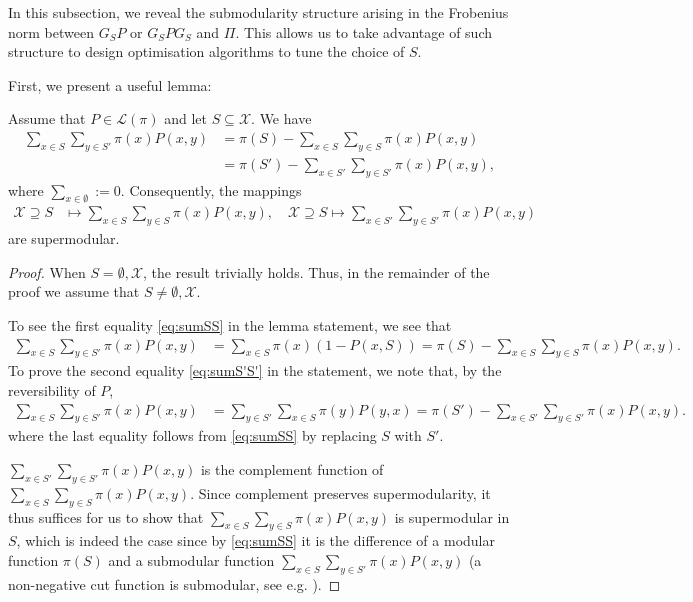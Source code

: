\documentclass[EJP]{ejpecp} %
\begin{document}
In this subsection, we reveal the submodularity structure arising in the Frobenius norm between $G_S P$ or $G_S P G_S$ and $\Pi$. This allows us to take advantage of such structure to design optimisation algorithms to tune the choice of $S$.

First, we present a useful lemma:
\begin{lemma}\label{lem:Qxy}
    Assume that $P \in \mathcal{L}(\pi)$ and let $S \subseteq \mathcal{X}$. We have
    \begin{align}
        \sum_{x \in S} \sum_{y \in S'} \pi(x) P(x,y) &= \pi(S) - \sum_{x \in S} \sum_{y \in S} \pi(x) P(x,y) \label{eq:sumSS}\\
                                                     &= \pi(S') - \sum_{x \in S'} \sum_{y \in S'} \pi(x) P(x,y), \label{eq:sumS'S'}
    \end{align}
    where $\sum_{x \in \emptyset} := 0$. Consequently, the mappings
    \begin{align*}
        \mathcal{X} \supseteq S &\mapsto \sum_{x \in S} \sum_{y \in S} \pi(x) P(x,y), \quad 
        \mathcal{X} \supseteq S \mapsto \sum_{x \in S'} \sum_{y \in S'} \pi(x) P(x,y)
    \end{align*}
    are supermodular.
\end{lemma}

\begin{proof}
    When $S = \emptyset, \mathcal{X}$, the result trivially holds. Thus, in the remainder of the proof we assume that $S \neq \emptyset, \mathcal{X}$.

    To see the first equality \eqref{eq:sumSS} in the lemma statement, we see that
    \begin{align*}
        \sum_{x \in S} \sum_{y \in S'} \pi(x) P(x,y) &= \sum_{x \in S} \pi(x) (1-P(x,S)) = \pi(S) - \sum_{x \in S} \sum_{y \in S} \pi(x) P(x,y).
    \end{align*}
    To prove the second equality \eqref{eq:sumS'S'} in the statement, we note that, by the reversibility of $P$, 
    \begin{align*}
        \sum_{x \in S} \sum_{y \in S'} \pi(x) P(x,y) &= \sum_{y \in S'}\sum_{x \in S} \pi(y)P(y,x) = \pi(S') - \sum_{x \in S'} \sum_{y \in S'} \pi(x) P(x,y).
    \end{align*}
    where the last equality follows from \eqref{eq:sumSS} by replacing $S$ with $S'$.

    $\sum_{x \in S'} \sum_{y \in S'} \pi(x) P(x,y)$ is the complement function of $\sum_{x \in S} \sum_{y \in S} \pi(x) P(x,y)$. Since complement preserves supermodularity, it thus suffices for us to show that $\sum_{x \in S} \sum_{y \in S} \pi(x) P(x,y)$ is supermodular in $S$, which is indeed the case since by \eqref{eq:sumSS} it is the difference of a modular function $\pi(S)$ and a submodular function $\sum_{x \in S} \sum_{y \in S'} \pi(x) P(x,y)$ (a non-negative cut function is submodular, see e.g. \cite[Section $6.2$]{bach2013learningsubmodularfunctionsconvex}).
\end{proof}
\end{document}
